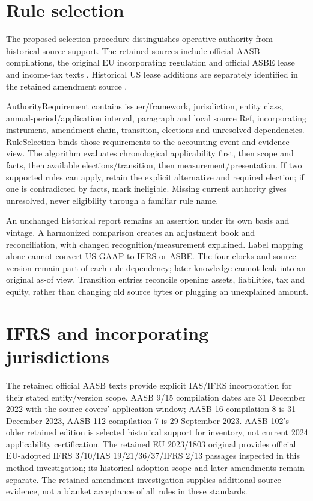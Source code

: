 \hypertarget{rule-selection}{%
\section{Rule selection}\label{method-standards-methods-rule-selection}}

The proposed selection procedure distinguishes operative authority from historical source support. The retained sources include official AASB compilations, the original EU incorporating regulation and official ASBE lease and income-tax texts \citep{aasb9dated,aasb15dated,aasb16dated,aasb112dated,eu20231803,mofasbe21,moflease2018,mofasbe18,mofinterpretation16}. Historical US lease additions are separately identified in the retained amendment source \citep{fasbasu201602}.

AuthorityRequirement contains issuer/framework, jurisdiction, entity class, annual-period/application interval, paragraph and local source Ref, incorporating instrument, amendment chain, transition, elections and unresolved dependencies. RuleSelection binds those requirements to the accounting event and evidence view. The algorithm evaluates chronological applicability first, then scope and facts, then available elections/transition, then measurement/presentation. If two supported rules can apply, retain the explicit alternative and required election; if one is contradicted by facts, mark ineligible. Missing current authority gives unresolved, never eligibility through a familiar rule name.

An unchanged historical report remains an assertion under its own basis and vintage. A harmonized comparison creates an adjustment book and reconciliation, with changed recognition/measurement explained. Label mapping alone cannot convert US GAAP to IFRS or ASBE. The four clocks and source version remain part of each rule dependency; later knowledge cannot leak into an original as-of view. Transition entries reconcile opening assets, liabilities, tax and equity, rather than changing old source bytes or plugging an unexplained amount.

\hypertarget{ifrs-and-incorporating-jurisdictions}{%
\section{IFRS and incorporating jurisdictions}\label{method-standards-methods-ifrs-and-incorporating-jurisdictions}}

The retained official AASB texts provide explicit IAS/IFRS incorporation for their stated entity/version scope. AASB 9/15 compilation dates are 31 December 2022 with the source covers' application window; AASB 16 compilation 8 is 31 December 2023, AASB 112 compilation 7 is 29 September 2023. AASB 102's older retained edition is selected historical support for inventory, not current 2024 applicability certification. The retained EU 2023/1803 original provides official EU-adopted IFRS 3/10/IAS 19/21/36/37/IFRS 2/13 passages inspected in this method investigation; its historical adoption scope and later amendments remain separate. The retained amendment investigation supplies additional source evidence, not a blanket acceptance of all rules in these standards.

